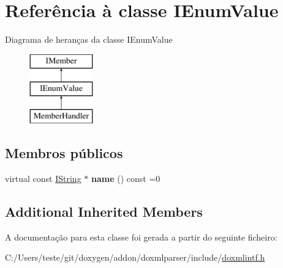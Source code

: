 \hypertarget{class_i_enum_value}{\section{Referência à classe I\-Enum\-Value}
\label{class_i_enum_value}
}
Diagrama de heranças da classe I\-Enum\-Value\begin{figure}[H]
\begin{center}
\leavevmode
\includegraphics[height=3.000000cm]{class_i_enum_value}
\end{center}
\end{figure}
\subsection*{Membros públicos}
\begin{DoxyCompactItemize}
\item 
\hypertarget{class_i_enum_value_af687440943d0a80c2b38cd5bb51b7a68}{virtual const \hyperlink{class_i_string}{I\-String} $\ast$ {\bfseries name} () const =0}\label{class_i_enum_value_af687440943d0a80c2b38cd5bb51b7a68}

\end{DoxyCompactItemize}
\subsection*{Additional Inherited Members}


A documentação para esta classe foi gerada a partir do seguinte ficheiro\-:\begin{DoxyCompactItemize}
\item 
C\-:/\-Users/teste/git/doxygen/addon/doxmlparser/include/\hyperlink{include_2doxmlintf_8h}{doxmlintf.\-h}\end{DoxyCompactItemize}
